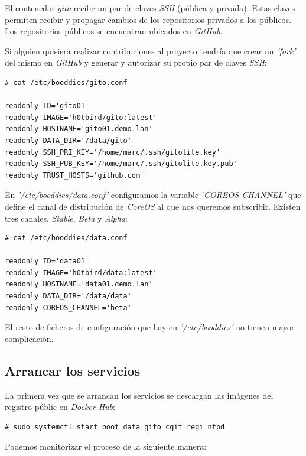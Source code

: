 \documentclass[a4paper,12pt,spanish,final]{epsc_tfc_pfc}
\begin{document}
El contenedor \emph{gito} recibe un par de claves \emph{SSH} (pública y privada). Estas claves permiten recibir y propagar cambios de los repositorios privados a los públicos. Los repositorios públicos se encuentran ubicados en \emph{GitHub}.

Si alguien quisiera realizar contribuciones al proyecto tendría que crear un \emph{'fork'} del mismo en \emph{GitHub} y generar y autorizar su propio par de claves \emph{SSH}:\\

\begin{lstlisting}[style=dnsmasq]
# cat /etc/booddies/gito.conf

readonly ID='gito01'
readonly IMAGE='h0tbird/gito:latest'
readonly HOSTNAME='gito01.demo.lan'
readonly DATA_DIR='/data/gito'
readonly SSH_PRI_KEY='/home/marc/.ssh/gitolite.key'
readonly SSH_PUB_KEY='/home/marc/.ssh/gitolite.key.pub'
readonly TRUST_HOSTS='github.com'
\end{lstlisting}

En \emph{'/etc/booddies/data.conf'} configuramos la variable \emph{'COREOS-CHANNEL'} que define el canal de distribución de \emph{CoreOS} al que nos queremos subscribir. Existen tres canales, \emph{Stable}, \emph{Beta} y \emph{Alpha}:\\

\begin{lstlisting}[style=dnsmasq]
# cat /etc/booddies/data.conf

readonly ID='data01'
readonly IMAGE='h0tbird/data:latest'
readonly HOSTNAME='data01.demo.lan'
readonly DATA_DIR='/data/data'
readonly COREOS_CHANNEL='beta'
\end{lstlisting}

El resto de ficheros de configuración que hay en \emph{'/etc/booddies'} no tienen mayor complicación.

\subsection{Arrancar los servicios}

La primera vez que se arrancan los servicios se descargan las imágenes del registro públic en \emph{Docker Hub}:\\

\begin{lstlisting}[style=dnsmasq]
# sudo systemctl start boot data gito cgit regi ntpd
\end{lstlisting}

Podemos monitorizar el proceso de la siguiente manera:\\
\end{document}

